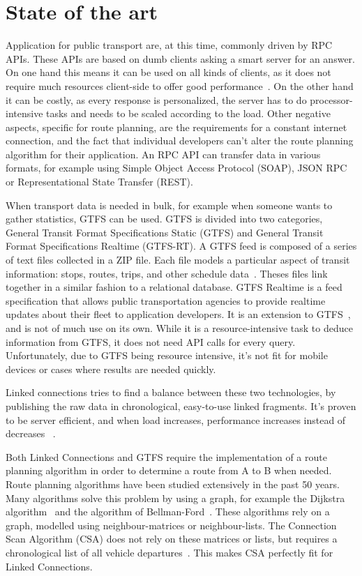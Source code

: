 \documentclass[twocolumn]{phdsymp} %
\begin{document}
\section{State of the art}
Application for public transport are, at this time, commonly driven by RPC APIs. These APIs are based on dumb clients asking a smart server for an answer. On one hand this means it can be used on all kinds of clients, as it does not require much resources client-side to offer good performance~\cite{Nelson81}. On the other hand it can be costly, as every response is personalized, the server has to do processor-intensive tasks and needs to be scaled according to the load. Other negative aspects, specific for route planning, are the requirements for a constant internet connection, and the fact that individual developers can’t alter the route planning algorithm for their application. An RPC API can transfer data in various formats, for example using Simple Object Access Protocol (SOAP), JSON RPC or Representational State Transfer (REST). 

When transport data is needed in bulk, for example when someone wants to gather statistics, GTFS can be used. GTFS is divided into two categories, General Transit Format Specifications Static (GTFS) and General Transit Format Specifications Realtime (GTFS-RT). A GTFS feed is composed of a series of text files collected in a ZIP file. Each file models a particular aspect of transit information: stops, routes, trips, and other schedule data~\cite{gtfs}. Theses files link together in a similar fashion to a relational database. GTFS Realtime is a feed specification that allows public transportation agencies to provide realtime updates about their fleet to application developers. It is an extension to GTFS~\cite{gtfs-realtime}, and is not of much use on its own.
While it is a resource-intensive task to deduce information from GTFS, it does not need API calls for every query. Unfortunately, due to GTFS being resource intensive, it’s not fit for mobile devices or cases where results are needed quickly.

Linked connections tries to find a balance between these two technologies, by publishing the raw data in chronological, easy-to-use linked fragments. It’s proven to be server efficient, and when load increases, performance increases instead of decreases ~\cite{colpaert17}.

Both Linked Connections and GTFS require the implementation of a route planning algorithm in order to determine a route from A to B when needed. Route planning algorithms have been studied extensively in the past 50 years. Many algorithms solve this problem by using a graph, for example the Dijkstra algorithm~\cite{dijkstra} and the algorithm of Bellman-Ford~\cite{bellman-ford}. These algorithms rely on a graph, modelled using neighbour-matrices or neighbour-lists. The Connection Scan Algorithm (CSA) does not rely on these matrices or lists, but requires a chronological list of all vehicle departures~\cite{csa}. This makes CSA perfectly fit for Linked Connections.
\end{document}
